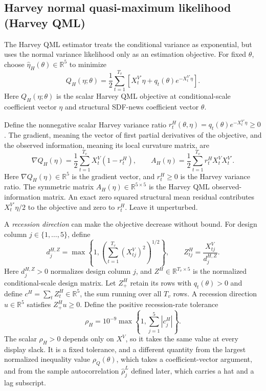 \documentclass[11pt]{article}
\begin{document}
\subsection{Harvey normal quasi-maximum likelihood (Harvey QML)}

The Harvey QML estimator treats the conditional
variance as exponential, but uses the normal variance likelihood only as an estimation objective. For fixed \(\theta\),
choose \(\widehat\eta_H(\theta)\in\mathbb R^5\) to minimize
\begin{equation*}
 Q_H(\eta;\theta)=\frac12\sum_{t=1}^{T_v}
 \left[X_t^{V\prime}\eta+q_t(\theta)e^{-X_t^{V\prime}\eta}\right].
\end{equation*}
Here \(Q_H(\eta;\theta)\) is the scalar Harvey QML objective at conditional-scale coefficient vector
\(\eta\) and structural SDF-news coefficient vector \(\theta\).

Define the nonnegative scalar Harvey variance ratio
\(r_t^H(\theta,\eta)=q_t(\theta)e^{-X_t^{V\prime}\eta}\ge0\). The gradient, meaning the vector of first partial derivatives of the objective,
and the observed information, meaning its local curvature matrix, are
\begin{equation*}
 \nabla Q_H(\eta)=\frac12\sum_{t=1}^{T_v}X_t^V(1-r_t^H),
 \qquad
 A_H(\eta)=\frac12\sum_{t=1}^{T_v}r_t^HX_t^VX_t^{V\prime}.
\end{equation*}
Here \(\nabla Q_H(\eta)\in\mathbb R^5\) is the gradient vector, and
\(r_t^H\ge0\) is the Harvey variance ratio. The symmetric matrix
\(A_H(\eta)\in\mathbb R^{5\times5}\) is the Harvey QML observed-information matrix.
An exact zero squared structural mean residual contributes \(X_t^{V\prime}\eta/2\) to the objective
and zero to \(r_t^H\). Leave it unperturbed.

A \emph{recession direction} can make the objective decrease without bound. For design column
\(j\in\{1,\ldots,5\}\), define
\begin{equation*}
 d_j^{H,Z}=\max\left\{1,\left(\sum_{t=1}^{T_v}(X_{tj}^V)^2\right)^{1/2}\right\},
 \qquad Z_{tj}^H=\frac{X_{tj}^V}{d_j^{H,Z}}.
\end{equation*}
Here \(d_j^{H,Z}>0\) normalizes design column \(j\), and \(Z^H\in\mathbb R^{T_v\times5}\) is the
normalized conditional-scale design matrix. Let \(Z_+^H\) retain its rows with
\(q_t(\theta)>0\) and define \(c^H=\sum_t Z_t^H\in\mathbb R^5\), the sum running over all \(T_v\)
rows. A recession direction \(u\in\mathbb R^5\) satisfies \(Z_+^Hu\ge0\). Define the positive
recession-rate tolerance
\begin{equation*}
 \rho_H=10^{-9}\max\left\{1,\sum_{j=1}^5|c_j^H|\right\}.
\end{equation*}
The scalar \(\rho_H>0\) depends only on \(X^V\), so it takes the same value at every display slack.
It is a fixed tolerance, and a different quantity from the largest normalized inequality value
\(\rho_Q(\theta)\), which takes a coefficient-vector argument, and from the sample autocorrelation
\(\widehat\rho_j^L\) defined later, which carries a hat and a lag subscript.
\end{document}
